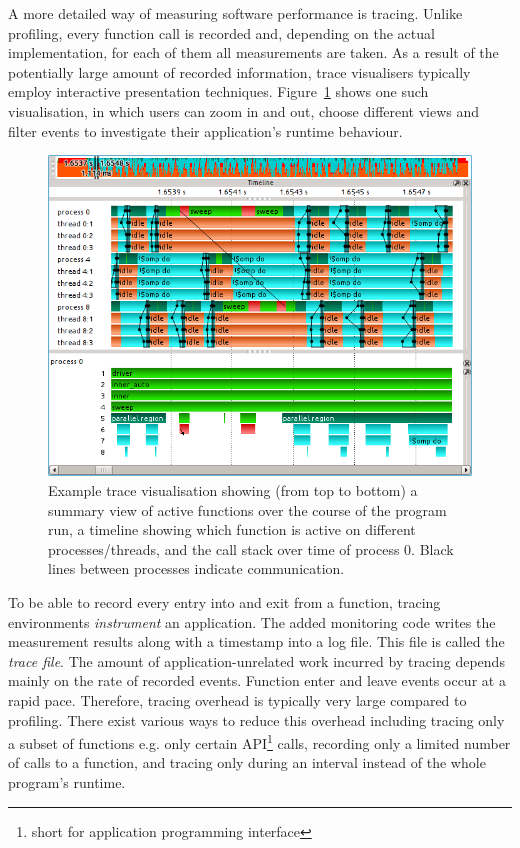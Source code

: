 \documentclass[a4paper, final, diplominf]{zih-template}
\begin{document}
A more detailed way of measuring software performance is tracing.
Unlike profiling, every function call is recorded and, depending on the actual implementation, for each of them all measurements are taken.
As a result of the potentially large amount of recorded information, trace visualisers typically employ interactive presentation techniques.
Figure~\ref{fig:trace-example-screenshot} shows one such visualisation, in which users can zoom in and out, choose different views and filter events to investigate their application's runtime behaviour.
\begin{figure}[tbh]
	\centering
	\includegraphics[width=13.08cm]{trace-example-screenshot}
	\caption{Example trace visualisation showing (from top to bottom) a summary view of active functions over the course of the program run, a timeline showing which function is active on different processes/threads, and the call stack over time of process 0. Black lines between processes indicate communication.}
	\label{fig:trace-example-screenshot}
\end{figure}
To be able to record every entry into and exit from a function, tracing environments \emph{instrument} an application.
The added monitoring code writes the measurement results along with a timestamp into a log file.
This file is called the \emph{trace file}.
The amount of application-unrelated work incurred by tracing depends mainly on the rate of recorded events.
Function enter and leave events occur at a rapid pace.
Therefore, tracing overhead is typically very large compared to profiling.
There exist various ways to reduce this overhead including tracing only a subset of functions e.g. only certain API\footnote{short for application programming interface} calls, recording only a limited number of calls to a function, and tracing only during an interval instead of the whole program's runtime.
\end{document}
